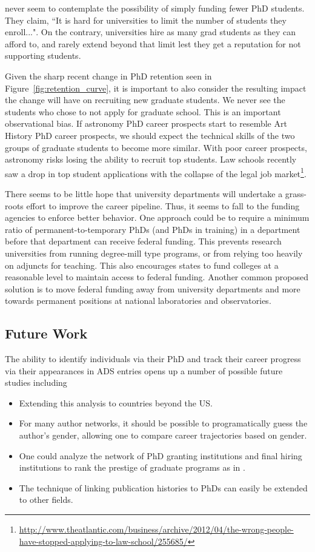 \documentclass[preprint2]{aastex}
\begin{document}
\citet{Cooray15} never seem to contemplate the possibility of simply funding fewer PhD students. They claim, ``It is hard for universities to limit the number of students they enroll...". On the contrary, universities hire as many grad students as they can afford to, and rarely extend beyond that limit lest they get a reputation for not supporting students.  

Given the sharp recent change in PhD retention seen in Figure~\ref{fig:retention_curve}, it is important to also consider the resulting impact the change will have on recruiting new graduate students. We never see the students who chose to not apply for graduate school. This is an important observational bias.  If astronomy PhD career prospects start to resemble Art History PhD career prospects, we should expect the technical skills of the two groups of graduate students to become more similar.  With poor career prospects, astronomy risks losing the ability to recruit top students. Law schools recently saw a drop in top student applications with the collapse of the legal job market\footnote{\url{http://www.theatlantic.com/business/archive/2012/04/the-wrong-people-have-stopped-applying-to-law-school/255685/}}.  

There seems to be little hope that university departments will undertake a grass-roots effort to improve the career pipeline. Thus, it seems to fall to the funding agencies to enforce better behavior.  One approach could be to require a minimum ratio of permanent-to-temporary PhDs (and PhDs in training) in a department before that department can receive federal funding.  This prevents research universities from running degree-mill type programs, or from relying too heavily on adjuncts for teaching.  This also encourages states to fund colleges at a reasonable level to maintain access to federal funding.  Another common proposed solution is to move federal funding away from university departments and more towards permanent positions at national laboratories and observatories.


\subsection{Future Work}

The ability to identify individuals via their PhD and track their career progress via their appearances in ADS entries opens up a number of possible future studies including
\begin{itemize}
\item{Extending this analysis to countries beyond the US.}
\item{For many author networks, it should be possible to programatically guess the author's gender, allowing one to compare career trajectories based on gender.}
\item{One could analyze the network of PhD granting institutions and final hiring institutions to rank the prestige of graduate programs as in \citet{Clausete15}.}
\item{The technique of linking publication histories to PhDs can easily be extended to other fields.}
\end{itemize}
\end{document}
